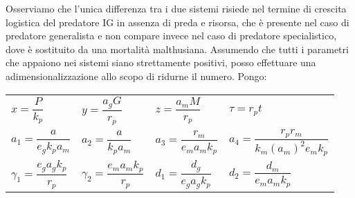 \documentclass[12pt,oneside]{report}
\begin{document}
\vspace{2cm}
\noindent
Osserviamo che l'unica differenza tra i due sistemi risiede nel termine di crescita logistica del predatore IG in assenza di preda e risorsa, che è presente nel caso di predatore generalista e non compare invece nel caso di predatore specialistico, dove è sostituito da una mortalità malthusiana.
Assumendo che tutti i parametri che appaiono nei sistemi siano strettamente positivi, posso effettuare una adimensionalizzazione allo scopo di ridurne il numero. Pongo: \\

 \begin{tabular}{llll}
$x=\dfrac{P}{k_p}$ & $y=\dfrac{a_gG}{r_p}$ & $z=\dfrac{a_mM}{r_p}$ & $\tau=r_pt$ \medskip \\
$a_1=\dfrac{a}{e_gk_pa_m}$ & $a_2=\dfrac{a}{k_pa_m}$ & $a_3=\dfrac{r_m}{e_ma_mk_p}$ & $a_4=\dfrac{r_pr_m}{k_m(a_m)^2e_mk_p}$ \medskip\\
$\gamma_1=\dfrac{e_ga_gk_p}{r_p}$ & $\gamma_2=\dfrac{e_ma_mk_p}{r_p}$ & $d_1=\dfrac{d_g}{e_ga_gk_p}$ & $d_2=\dfrac{d_m}{e_ma_mk_p}$
\end{tabular} \\
\end{document}
